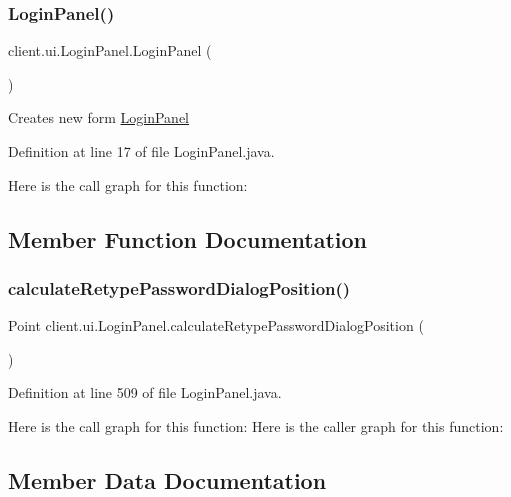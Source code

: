 \subsubsection{\texorpdfstring{Login\+Panel()}{LoginPanel()}}
{\footnotesize\ttfamily client.\+ui.\+Login\+Panel.\+Login\+Panel (\begin{DoxyParamCaption}{ }\end{DoxyParamCaption})}

Creates new form \hyperlink{classclient_1_1ui_1_1_login_panel}{Login\+Panel} 

Definition at line 17 of file Login\+Panel.\+java.

Here is the call graph for this function\+:


\subsection{Member Function Documentation}
\hypertarget{classclient_1_1ui_1_1_login_panel_a9726aa2bc3416aa22ad43d2b4b9eed70}{}\label{classclient_1_1ui_1_1_login_panel_a9726aa2bc3416aa22ad43d2b4b9eed70} 
\subsubsection{\texorpdfstring{calculate\+Retype\+Password\+Dialog\+Position()}{calculateRetypePasswordDialogPosition()}}
{\footnotesize\ttfamily Point client.\+ui.\+Login\+Panel.\+calculate\+Retype\+Password\+Dialog\+Position (\begin{DoxyParamCaption}{ }\end{DoxyParamCaption})}



Definition at line 509 of file Login\+Panel.\+java.

Here is the call graph for this function\+:
Here is the caller graph for this function\+:


\subsection{Member Data Documentation}
\hypertarget{classclient_1_1ui_1_1_login_panel_a4b3258e8faace6462f58c79cb4a08835}{}\label{classclient_1_1ui_1_1_login_panel_a4b3258e8faace6462f58c79cb4a08835} 
